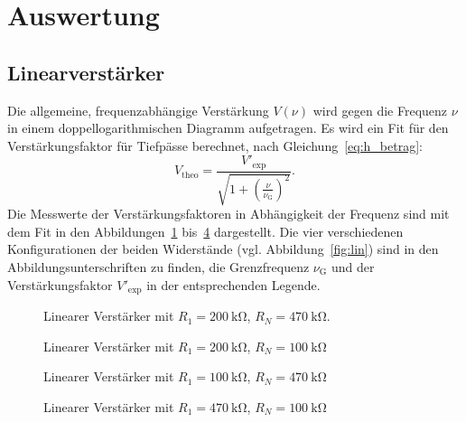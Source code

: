 \section{Auswertung}%
\label{sec:auswertung}
\subsection{Linearverst\"arker}
Die allgemeine, frequenzabhängige Verstärkung $V\!\left(\nu\right)$ wird gegen die Frequenz $\nu$ in einem doppellogarithmischen Diagramm aufgetragen.
Es wird ein Fit für den Verstärkungsfaktor für Tiefpässe berechnet, nach Gleichung~\eqref{eq:h_betrag}:
\begin{equation}
  V_\text{theo} = \frac{V'_{\text{exp}}}{\sqrt{1 + {\left({\frac{\nu}{\nu_\text{G}}}\right)}^{2}}}.
\end{equation}
Die Messwerte der Verstärkungsfaktoren in Abhängigkeit der Frequenz
sind mit dem Fit in den Abbildungen~\ref{fig:lin_verst_01} bis~\ref{fig:lin_verst_04} dargestellt.
Die vier verschiedenen Konfigurationen der beiden Widerstände (vgl. Abbildung~\ref{fig:lin})
sind in den Abbildungsunterschriften zu finden,
die Grenzfrequenz $\nu_\text{G}$ und der Verstärkungsfaktor $V'_\text{exp}$ in der entsprechenden Legende.

\begin{figure}[ht]
  \centering
  
  \caption{Linearer Verst\"arker mit $R_1 = \SI{200}{\kilo\ohm}$, $R_N = \SI{470}{\kilo\ohm}$.}
  \label{fig:lin_verst_01}
\end{figure}

\begin{figure}[ht]
  \centering
  
  \caption{Linearer Verst\"arker mit $R_1 = \SI{200}{\kilo\ohm}$, $R_N = \SI{100}{\kilo\ohm}$}
  \label{fig:lin_verst_02}
\end{figure}

\begin{figure}[ht]
  \centering
  
  \caption{Linearer Verst\"arker mit $R_1 = \SI{100}{\kilo\ohm}$, $R_N = \SI{470}{\kilo\ohm}$}
  \label{fig:lin_verst_03}
\end{figure}

\begin{figure}[ht]
  \centering
  
  \caption{Linearer Verst\"arker mit $R_1 = \SI{470}{\kilo\ohm}$, $R_N = \SI{100}{\kilo\ohm}$}
  \label{fig:lin_verst_04}
\end{figure}

